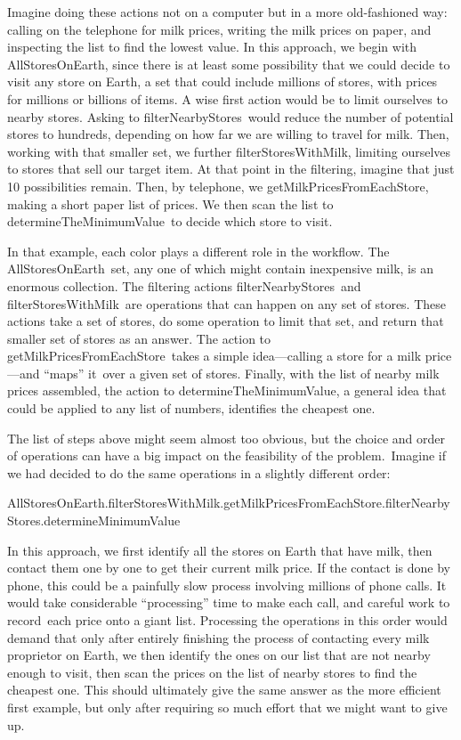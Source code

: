 \documentclass[
  letterpaper,
  DIV=11,
  numbers=noendperiod]{scrreprt}
\begin{document}
Imagine doing these actions not on a computer but in a more
old-fashioned way: calling on the telephone for milk prices, writing the
milk prices on paper, and inspecting the list to find the lowest value.
In this approach, we begin with AllStoresOnEarth, since there is at
least some possibility that we could decide to visit any store on Earth,
a set that could include millions of stores, with prices for millions or
billions of items. A wise first action would be to limit ourselves to
nearby stores. Asking to filterNearbyStores~would reduce the number of
potential stores to hundreds, depending on how far we are willing to
travel for milk. Then, working with that smaller set, we further
filterStoresWithMilk, limiting ourselves to stores that sell our target
item. At that point in the filtering, imagine that just 10 possibilities
remain. Then, by telephone, we getMilkPricesFromEachStore, making a
short paper list of prices. We then scan the list to
determineTheMinimumValue~to decide which store to visit.

In that example, each color plays a different role in the workflow. The
AllStoresOnEarth~set, any one of which might contain inexpensive milk,
is an enormous collection. The filtering actions filterNearbyStores~and
filterStoresWithMilk~are operations that can happen on any set of
stores. These actions take a set of stores, do some operation to limit
that set, and return that smaller set of stores as an answer. The action
to getMilkPricesFromEachStore~takes a simple idea---calling a store for
a milk price---and ``maps'' it~over a given set of stores. Finally, with
the list of nearby milk prices assembled, the action to
determineTheMinimumValue, a general idea that could be applied to any
list of numbers, identifies the cheapest one.

The list of steps above might seem almost too obvious, but the choice
and order of operations can have a big impact on the feasibility of the
problem.~Imagine if we had decided to do the same operations in a
slightly different order:

AllStoresOnEarth.filterStoresWithMilk.getMilkPricesFromEachStore.filterNearbyStores.determineMinimumValue

In this approach, we first identify all the stores on Earth that have
milk, then contact them one by one to get their current milk price. If
the contact is done by phone, this could be a painfully slow process
involving millions of phone calls. It would take considerable
``processing'' time to make each call, and careful work to record~each
price onto a giant list. Processing the operations in this order would
demand that only after entirely finishing the process of contacting
every milk proprietor on Earth, we then identify the ones on our list
that are not nearby enough to visit, then scan the prices on the list of
nearby stores to find the cheapest one. This should ultimately give the
same answer as the more efficient first example, but only after
requiring so much effort that we might want to give up.
\end{document}
